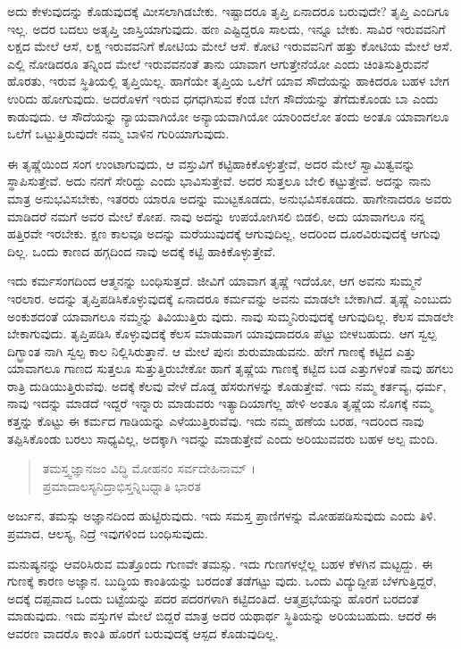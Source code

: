 ಅದು ಕೇಳುವುದನ್ನು ಕೊಡುವುದಕ್ಕೆ ಮೀಸಲಾಗಿಡಬೇಕು. ಇಷ್ಟಾದರೂ ತೃಪ್ತಿ ಏನಾದರೂ ಬರುವುದೇ? ತೃಪ್ತಿ ಎಂದಿಗೂ ಇಲ್ಲ. ಅದರ ಬದಲು ಅತೃಪ್ತಿ ಜಾಸ್ತಿಯಾಗುವುದು. ಹಣ ಎಷ್ಟಿದ್ದರೂ ಸಾಲದು, ಇನ್ನೂ ಬೇಕು. ಸಾವಿರ ಇರುವವನಿಗೆ ಲಕ್ಷದ ಮೇಲೆ ಆಸೆ, ಲಕ್ಷ ಇರುವವನಿಗೆ ಕೋಟಿಯ ಮೇಲೆ ಆಸೆ. ಕೋಟಿ ಇರುವವನಿಗೆ ಹತ್ತು ಕೋಟಿಯ ಮೇಲೆ ಆಸೆ. ಎಲ್ಲಿ ನೋಡಿದರೂ ತನ್ನಿಂದ ಮೇಲೆ ಇರುವವನಂತೆ ತಾನು ಯಾವಾಗ ಆಗುತ್ತೇನೆಯೋ ಎಂದು ಚಿಂತಿಸುತ್ತಿರುವನೆ ಹೊರತು, ಇರುವ ಸ್ಥಿತಿಯಲ್ಲಿ ತೃಪ್ತಿಯಿಲ್ಲ. ಹಾಗೆಯೇ ತೃಪ್ತಿಯ ಒಲೆಗೆ ಯಾವ ಸೌದೆಯನ್ನು ಹಾಕಿದರೂ ಬಹಳ ಬೇಗ ಉರಿದು ಹೋಗುವುದು. ಅದರೊಳಗೆ ಇರುವ ಧಗಧಗಿಸುವ ಕೆಂಡ ಬೇಗ ಸೌದೆಯನ್ನು ತೆಗೆದುಕೊಂಡು ಬಾ ಎಂದು ಕಾಡುವುದು. ಆ ಸೌದೆಯನ್ನು ನ್ಯಾಯವಾಗಿಯೋ ಅನ್ಯಾಯವಾಗಿಯೋ ಯಾರಿಂದಲೋ ತಂದು ಅಂತೂ ಯಾವಾಗಲೂ ಒಲೆಗೆ ಒಟ್ಟುತ್ತಿರುವುದೇ ನಮ್ಮ ಬಾಳಿನ ಗುರಿಯಾಗುವುದು.

ಈ ತೃಷ್ಣೆಯಿಂದ ಸಂಗ ಉಂಟಾಗುವುದು, ಆ ವಸ್ತುವಿಗೆ ಕಟ್ಟಿಹಾಕಿಕೊಳ್ಳುತ್ತೇವೆ, ಅದರ ಮೇಲೆ ಸ್ವಾಮಿತ್ವವನ್ನು ಸ್ಥಾಪಿಸುತ್ತೇವೆ. ಅದು ನನಗೆ ಸೇರಿದ್ದು ಎಂದು ಭಾವಿಸುತ್ತೇವೆ. ಅದರ ಸುತ್ತಲೂ ಬೇಲಿ ಕಟ್ಟುತ್ತೇವೆ. ಅದನ್ನು ನಾನು ಮಾತ್ರ ಅನುಭವಿಸಬೇಕು, ಇತರರು ಯಾರೂ ಅದನ್ನು ಮುಟ್ಟಕೂಡದು, ಅನುಭವಿಸಕೂಡದು. ಹಾಗೇನಾದರೂ ಅವರು ಮಾಡಿದರೆ ನಮಗೆ ಅವರ ಮೇಲೆ ಕೋಪ. ನಾವು ಅದನ್ನು ಉಪಯೋಗಿಸಲಿ ಬಿಡಲಿ, ಅದು ಯಾವಾಗಲೂ ನನ್ನ ಹತ್ತಿರವೇ ಇರಬೇಕು. ಕ್ಷಣ ಕಾಲವೂ ಅದನ್ನು ಮರೆಯುವುದಕ್ಕೆ ಆಗುವುದಿಲ್ಲ, ಅದರಿಂದ ದೂರವಿರುವುದಕ್ಕೆ ಆಗುವು ದಿಲ್ಲ. ಒಂದು ಕಾಣದ ಹಗ್ಗದಿಂದ ನಾವು ಅದಕ್ಕೆ ಕಟ್ಟಿ ಹಾಕಿಕೊಳ್ಳುತ್ತೇವೆ.

ಇದು ಕರ್ಮಸಂಗದಿಂದ ಆತ್ಮನನ್ನು ಬಂಧಿಸುತ್ತದೆ. ಜೀವಿಗೆ ಯಾವಾಗ ತೃಷ್ಣೆ ಇದೆಯೋ, ಆಗ ಅವನು ಸುಮ್ಮನೆ ಇರಲಾರ. ಅದನ್ನು ತೃಪ್ತಿಪಡಿಸಿಕೊಳ್ಳುವುದಕ್ಕೆ ಏನಾದರೂ ಕರ್ಮವನ್ನು ಅವನು ಮಾಡಲೇ ಬೇಕಾಗಿದೆ. ತೃಷ್ಣೆ ಎಂಬುದು ಅಂಕುಶದಂತೆ ಯಾವಾಗಲೂ ನಮ್ಮನ್ನು ತಿವಿಯುತ್ತಿರು ವುದು. ನಾವು ಸುಮ್ಮನಿರುವುದಕ್ಕೆ ಆಗುವುದಿಲ್ಲ. ಕೆಲಸ ಮಾಡಲೇ ಬೇಕಾಗುವುದು. ತೃಪ್ತಿಪಡಿಸಿ ಕೊಳ್ಳುವುದಕ್ಕೆ ಕೆಲಸ ಮಾಡುವಾಗ ಯಾವುದಾದರೂ ಪೆಟ್ಟು ಬೀಳಬಹುದು. ಆಗ ಸ್ವಲ್ಪ ದಿಗ್ಭ್ರಾಂತ ನಾಗಿ ಸ್ವಲ್ಪ ಕಾಲ ನಿಲ್ಲಿಸಿರುತ್ತಾನೆ. ಆ ಮೇಲೆ ಪುನಃ ಶುರುಮಾಡುವನು. ಹೇಗೆ ಗಾಣಕ್ಕೆ ಕಟ್ಟಿದ ಎತ್ತು ಯಾವಾಗಲೂ ಗಾಣದ ಸುತ್ತಲೂ ಸುತ್ತುತ್ತಿರುಬೇಕೋ ಹಾಗೆ ತೃಷ್ಣೆಯ ಗಾಣಕ್ಕೆ ಕಟ್ಟಿದ ಬಡ ಎತ್ತುಗಳಂತೆ ನಾವು ಹಗಲು ರಾತ್ರಿ ದುಡಿಯುತ್ತಿರುವೆವು. ಅದಕ್ಕೆ ಕೆಲವು ವೇಳೆ ದೊಡ್ಡ ಹೆಸರುಗಳನ್ನು ಕೊಡುತ್ತೇವೆ. ಇದು ನಮ್ಮ ಕರ್ತವ್ಯ, ಧರ್ಮ, ನಾವು ಇದನ್ನು ಮಾಡದೆ ಇದ್ದರೆ ಇನ್ನಾರು ಮಾಡುವರು ಇತ್ಯಾದಿಯಾಗೆಲ್ಲ ಹೇಳಿ ಅಂತೂ ತೃಷ್ಣೆಯ ನೊಗಕ್ಕೆ ನಮ್ಮ ಕತ್ತನ್ನು ಕೊಟ್ಟು ಈ ಕರ್ಮದ ಗಾಡಿಯನ್ನು ಎಳೆಯುತ್ತಿರುವೆವು. ಇದು ನಮ್ಮ ಹಣೆಯ ಬರಹ, ಇದರಿಂದ ನಾವು ತಪ್ಪಿಸಿಕೊಂಡು ಬರಲು ಸಾಧ್ಯವಿಲ್ಲ, ಅದಕ್ಕಾಗಿ ಇದನ್ನು ಮಾಡುತ್ತೇವೆ ಎಂದು ಅರಿಯುವವರು ಬಹಳ ಅಲ್ಪ ಮಂದಿ.

\begin{verse}
ತಮಸ್ತ್ವಜ್ಞಾನಜಂ ವಿದ್ಧಿ ಮೋಹನಂ ಸರ್ವದೇಹಿನಾಮ್ ।\\ಪ್ರಮಾದಾಲಸ್ಯನಿದ್ರಾಭಿಸ್ತನ್ನಿಬಧ್ನಾತಿ ಭಾರತ 
\end{verse}

{\small ಅರ್ಜುನ, ತಮಸ್ಸು ಅಜ್ಞಾನದಿಂದ ಹುಟ್ಟಿರುವುದು. ಇದು ಸಮಸ್ತ ಪ್ರಾಣಿಗಳನ್ನು ಮೋಹಪಡಿಸುವುದು ಎಂದು ತಿಳಿ. ಪ್ರಮಾದ, ಆಲಸ್ಯ, ನಿದ್ರೆ ಇವುಗಳಿಂದ ಬಂಧಿಸುವುದು.}

ಮನುಷ್ಯನನ್ನು ಆವರಿಸಿರುವ ಮತ್ತೊಂದು ಗುಣವೇ ತಮಸ್ಸು. ಇದು ಗುಣಗಳಲ್ಲೆಲ್ಲ ಬಹಳ ಕೆಳಗಿನ ಮಟ್ಟದ್ದು. ಈ ಗುಣಕ್ಕೆ ಕಾರಣ ಅಜ್ಞಾನ. ಬುದ್ಧಿಯ ಕಾಂತಿಯನ್ನು ಬರದಂತೆ ತಡೆಗಟ್ಟು ವುದು. ಒಂದು ವಿದ್ಯುದ್ದೀಪ ಬೆಳಗುತ್ತಿದ್ದರೆ, ಅದಕ್ಕೆ ದಪ್ಪವಾದ ಒಂದು ಬಟ್ಟೆಯನ್ನು ಪದರ ಪದರಗಳಾಗಿ ಕಟ್ಟಿದಂತಿದೆ. ಆತ್ಮಪ್ರಭೆಯನ್ನು ಹೊರಗೆ ಬರದಂತೆ ಮಾಡುವುದು. ಇದು ವಸ್ತುಗಳ ಮೇಲೆ ಬಿದ್ದರೆ ಮಾತ್ರ ಅದರ ಯಥಾರ್ಥ ಸ್ಥಿತಿಯನ್ನು ಅರಿಯಬಹುದು. ಆದರೆ ಈ ಆವರಣ ವಾದರೊ ಕಾಂತಿ ಹೊರಗೆ ಬರುವುದಕ್ಕೆ ಆಸ್ಪದ ಕೊಡುವುದಿಲ್ಲ.

